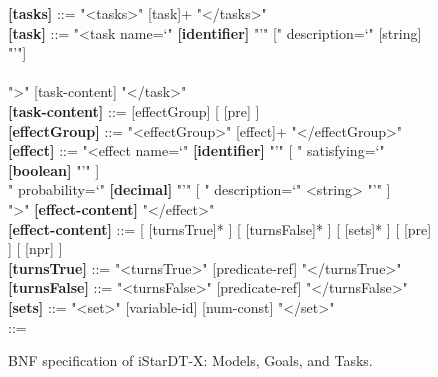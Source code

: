 \begin{figure}[p]
\begin{tcolorbox}[title=iStar-DT-X Grammar,colbacktitle=orange!40!white,coltitle=black,fonttitle=\bfseries,adjusted title=iStarDT-X Grammar (2/3),halign title=flush center]
\begin{scriptsize}
\begin{scriptsize}
\begin{tabbing}
\textbf{[tasks]} \> ::= \> "<tasks>" [task]+ "</tasks>"\\
\textbf{[task]} \> ::= "<task name=`" \textbf{[identifier]} "'" [" description=`" [string] "'"] \\
\>\> \red{[" actor=`" [identifier] "'"] [" delegation-style=" [del-style] "]} \\
\>\> ">" [task-content] "</task>" \\
\textbf{[task-content]} \> ::= \red{[ [parameters] ]} [effectGroup] [ [pre] ] \red{[ [tri] ]}\\
\textbf{[effectGroup]} \> ::= "<effectGroup>" [effect]+ "</effectGroup>"\\
\textbf{[effect]} \> ::= "<effect name=`" \textbf{[identifier]} "'" [ " satisfying=`" \textbf{[boolean]} "'" ] \\ \>\> " probability=`" \textbf{[decimal]} "'" [ " description=`" <string> "'" ] \\
 \>\>  ">" \textbf{[effect-content]} "</effect>"\\
\textbf{[effect-content]} \> ::= [ [turnsTrue]* ] [ [turnsFalse]* ] [ [sets]* ] [ [pre] ] [ [npr] ]\\
\textbf{[turnsTrue]} \> ::= "<turnsTrue>" [predicate-ref] "</turnsTrue>"\\
\textbf{[turnsFalse]} \> ::= "<turnsFalse>" [predicate-ref] "</turnsFalse>"\\
\textbf{[sets]} \> ::= "<set>" [variable-id] [num-const] "</set>"\\
 \> ::=  \\
\end{tabbing}
\end{scriptsize}

\rmfamily

\end{scriptsize}
\end{tcolorbox}
\caption{BNF specification of iStarDT-X: Models, Goals, and Tasks.}\label{fig:iStarDT-X-Goals}
\end{figure}
